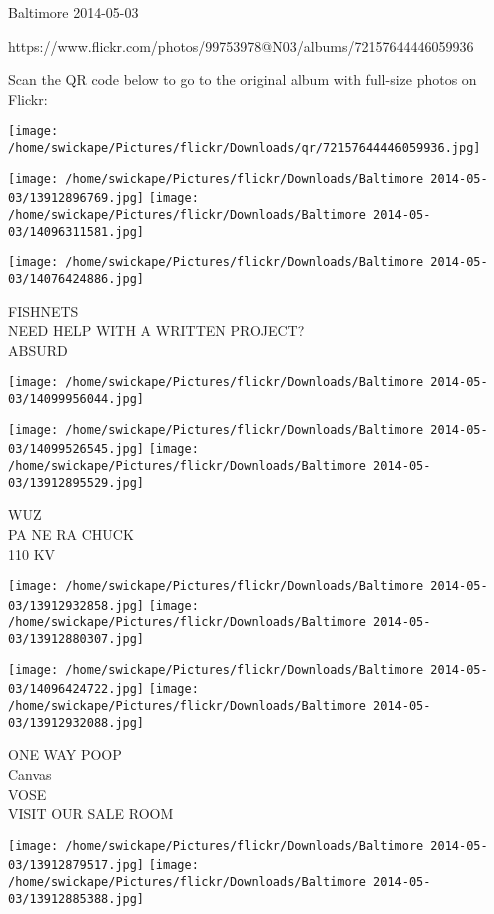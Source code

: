 \documentclass[10pt,letterpaper]{article}
\begin{document}
Baltimore 2014-05-03

https://www.flickr.com/photos/99753978@N03/albums/72157644446059936

Scan the QR code below to go to the original album with full-size photos on Flickr:

\texttt{[image: /home/swickape/Pictures/flickr/Downloads/qr/72157644446059936.jpg]}
\pagebreak

\texttt{[image: /home/swickape/Pictures/flickr/Downloads/Baltimore 2014-05-03/13912896769.jpg]}
\texttt{[image: /home/swickape/Pictures/flickr/Downloads/Baltimore 2014-05-03/14096311581.jpg]}

\texttt{[image: /home/swickape/Pictures/flickr/Downloads/Baltimore 2014-05-03/14076424886.jpg]}

FISHNETS\\
NEED HELP WITH A WRITTEN PROJECT?\\
ABSURD\\
\pagebreak

\texttt{[image: /home/swickape/Pictures/flickr/Downloads/Baltimore 2014-05-03/14099956044.jpg]}

\vspace{0.25in}
\texttt{[image: /home/swickape/Pictures/flickr/Downloads/Baltimore 2014-05-03/14099526545.jpg]}
\texttt{[image: /home/swickape/Pictures/flickr/Downloads/Baltimore 2014-05-03/13912895529.jpg]}

WUZ\\
PA NE RA CHUCK\\
110 KV\\
\pagebreak

\texttt{[image: /home/swickape/Pictures/flickr/Downloads/Baltimore 2014-05-03/13912932858.jpg]}
\texttt{[image: /home/swickape/Pictures/flickr/Downloads/Baltimore 2014-05-03/13912880307.jpg]}

\texttt{[image: /home/swickape/Pictures/flickr/Downloads/Baltimore 2014-05-03/14096424722.jpg]}
\texttt{[image: /home/swickape/Pictures/flickr/Downloads/Baltimore 2014-05-03/13912932088.jpg]}

ONE WAY POOP\\
Canvas\\
VOSE\\
VISIT OUR SALE ROOM\\
\pagebreak

\texttt{[image: /home/swickape/Pictures/flickr/Downloads/Baltimore 2014-05-03/13912879517.jpg]}
\texttt{[image: /home/swickape/Pictures/flickr/Downloads/Baltimore 2014-05-03/13912885388.jpg]}
\end{document}
